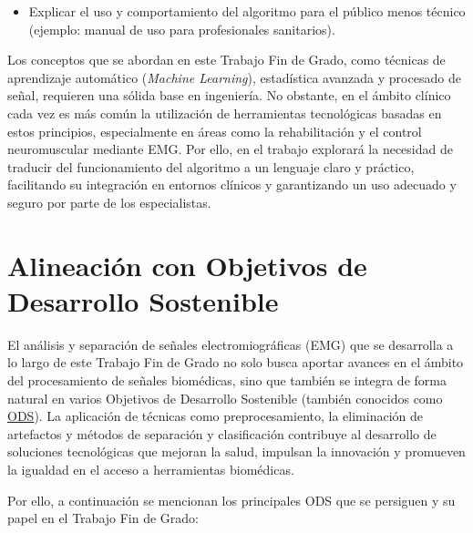 \documentclass[12pt, a4paper]{article}
\let\chapter\section
\begin{document}
\begin{itemize}
    \item Explicar el uso y comportamiento del algoritmo para el público menos técnico (ejemplo: manual de uso para profesionales sanitarios).
\end{itemize}
\noindent Los conceptos que se abordan en este Trabajo Fin de Grado, como técnicas de aprendizaje automático (\textit{Machine Learning}), estadística avanzada y procesado de señal, requieren una sólida base en ingeniería. No obstante, en el ámbito clínico cada vez es más común la utilización de herramientas tecnológicas basadas en estos principios, especialmente en áreas como la rehabilitación y el control neuromuscular mediante EMG. Por ello, en el trabajo explorará la necesidad de traducir del funcionamiento del algoritmo a un lenguaje claro y práctico, facilitando su integración en entornos clínicos y garantizando un uso adecuado y seguro por parte de los especialistas.

\chapter{Alineación con Objetivos de Desarrollo Sostenible}
El análisis y separación de señales electromiográficas (EMG) que se desarrolla a lo largo de este Trabajo Fin de Grado no solo busca aportar avances en el ámbito del procesamiento de señales biomédicas, sino que también se integra de forma natural en varios Objetivos de Desarrollo Sostenible (también conocidos como \href{https://sdgs.un.org/goals}{ODS}). La aplicación de técnicas como preprocesamiento, la eliminación de artefactos y métodos de separación y clasificación contribuye al desarrollo de soluciones tecnológicas que mejoran la salud, impulsan la innovación y promueven la igualdad en el acceso a herramientas biomédicas. 

Por ello, a continuación se mencionan los principales ODS que se persiguen y su papel en el Trabajo Fin de Grado:
\end{document}
